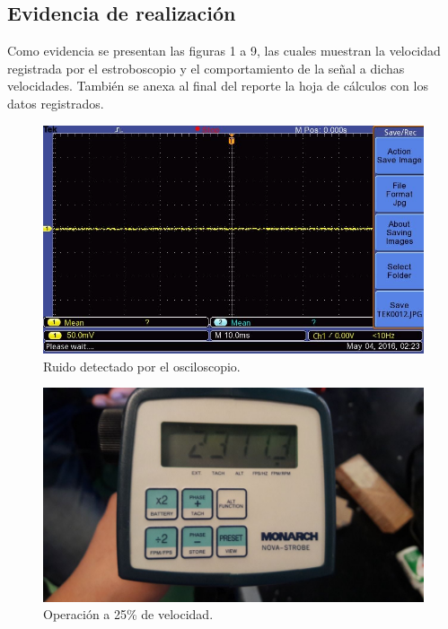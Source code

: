 
\subsection{Evidencia de realizaci\'on}
Como evidencia se presentan las figuras 1 a 9, las cuales muestran la velocidad registrada por el
estroboscopio y el comportamiento de la se\~nal a dichas velocidades. Tambi\'en se anexa al final
del reporte la hoja de c\'alculos con los datos registrados.

  \begin{figure}[!htbp]
 \centering
 \includegraphics [scale=0.25]
 {./img/tek0012.jpg}
  \caption{Ruido detectado por el osciloscopio.}
 \end{figure}

 \begin{figure}[!htbp]
 \centering
 \includegraphics [scale=0.2]
 {./img/2311.jpg}
  \caption{Operaci\'on a 25\% de velocidad.}
 \end{figure}

